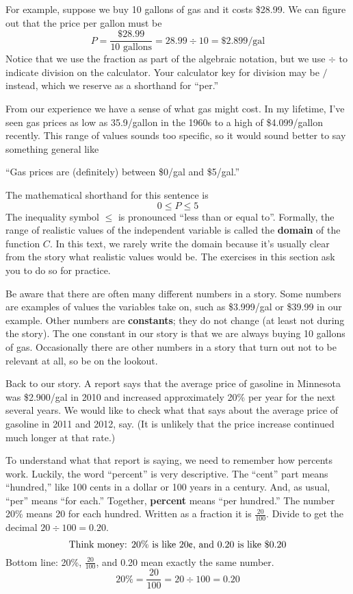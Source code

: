 For example, suppose we buy 10 gallons of gas and it costs \$28.99.  We can figure out that the price per gallon must be
$$P=\frac{\$28.99}{10 \text{ gallons}}= 28.99 \div 10 = \$2.899 \text{/gal}$$  Notice that we use the fraction as part of the algebraic notation, but we use $\div$ to indicate division on the calculator.  Your calculator key for division may be $/$ instead, which we reserve as a shorthand for ``per.''

From our experience we have a sense of what gas might cost.  In my lifetime, I've seen gas prices as low as 35.9\textcent \hspace{.05in}/gallon in the 1960s to a high of \$4.099/gallon recently.  This range of values sounds too specific, so it would sound better to say something general like \begin{center} ``Gas prices are (definitely) between \$0/gal and \$5/gal.'' \end{center} 

The mathematical shorthand for this sentence is $$0 \le P \le 5$$  The inequality symbol $\le$ is pronounced ``less than or equal to''.  Formally, the range of realistic values of the independent variable is called the \textbf{domain} of the function $C$.  In this text, we rarely write the domain because it's usually clear from the story what realistic values would be.  The exercises in this section ask you to do so for practice.

Be aware that there are often many different numbers in a story.  Some numbers are examples of values the variables take on, such as \$3.999/gal or \$39.99 in our example.  Other numbers are \textbf{constants}; they do not change (at least not during the story).  The one constant in our story is that we are always buying 10 gallons of gas.  Occasionally there are other numbers in a story that turn out not to be relevant at all, so be on the lookout.

Back to our story.  A report says that the average price of gasoline in Minnesota was  \$2.900/gal in 2010 and increased approximately 20\% per year for the next several years.  We would like to check what that says about the average price of gasoline in 2011 and 2012, say.  (It is unlikely that the price increase continued much longer at that rate.)

To understand what that report is saying, we need to remember how percents work.  Luckily, the word ``percent'' is very descriptive.  The ``cent'' part means ``hundred,'' like 100 cents in a dollar or 100 years in a century.  And, as usual, ``per'' means ``for each.''  Together, \textbf{percent} means ``per hundred.''  The number 20\% means 20 for each hundred.  Written as a fraction it is $\frac{20}{100}$.  Divide to get the decimal $20 \div 100 = 0.20.$   
$$\text{Think money:  }20\%\text{ is like }20\text{\textcent , and }0.20\text{ is like }\$0.20$$  
Bottom line:  20\%, $\frac{20}{100}$, and 0.20 mean exactly the same number.
$$20\% = \frac{20}{100} = 20 \div 100 = 0.20$$


